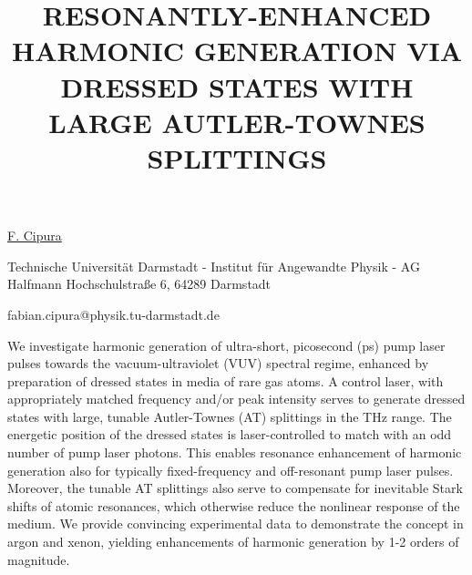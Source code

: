 \title{RESONANTLY-ENHANCED HARMONIC GENERATION VIA DRESSED STATES WITH LARGE AUTLER-TOWNES SPLITTINGS}

\underline{F. Cipura}  

{\normalsize{\vspace{-4mm}
Technische Universit\"{a}t Darmstadt - Institut f\"{u}r Angewandte Physik - AG Halfmann
Hochschulstra\ss e 6,
64289 Darmstadt



\email fabian.cipura@physik.tu-darmstadt.de}}

We investigate harmonic generation of ultra-short, picosecond (ps) pump laser pulses towards the vacuum-ultraviolet (VUV) spectral regime, enhanced by preparation of dressed states in media of rare gas atoms. A control laser, with appropriately matched frequency and/or peak intensity serves to generate dressed states with large, tunable Autler-Townes (AT) splittings in the THz range. The energetic position of the dressed states is laser-controlled to match with an odd number of pump laser photons. This enables resonance enhancement of harmonic generation also for typically fixed-frequency and off-resonant pump laser pulses. Moreover, the tunable AT splittings also serve to compensate for inevitable Stark shifts of atomic resonances, which otherwise reduce the nonlinear response of the medium. We provide convincing experimental data to demonstrate the concept in argon and xenon, yielding enhancements of harmonic generation by 1-2 orders of magnitude.

\vspace{\baselineskip}
